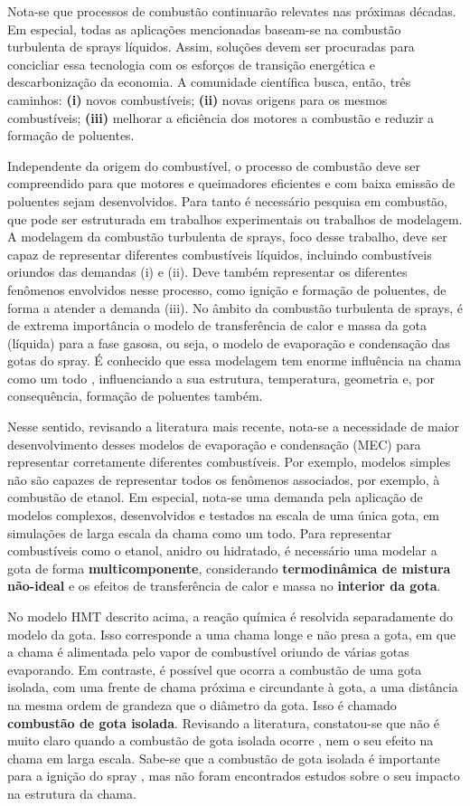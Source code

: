 Nota-se que processos de combustão continuarão relevates nas próximas décadas.
Em especial, todas as aplicações mencionadas baseam-se na combustão turbulenta de sprays líquidos.
Assim, soluções devem ser procuradas para concicliar essa tecnologia com os esforços de transição energética e descarbonização da economia.
A comunidade científica busca, então, três caminhos: \textbf{(i)} novos combustíveis; \textbf{(ii)} novas origens para os mesmos combustíveis; \textbf{(iii)} melhorar a eficiência dos motores a combustão e reduzir a formação de poluentes.

Independente da origem do combustível, o processo de combustão deve ser compreendido para que motores e queimadores eficientes e com baixa emissão de poluentes sejam desenvolvidos.
Para tanto é necessário pesquisa em combustão, que pode ser estruturada em trabalhos experimentais ou trabalhos de modelagem.
A modelagem da combustão turbulenta de sprays, foco desse trabalho, deve ser capaz de representar diferentes combustíveis líquidos, incluindo combustíveis oriundos das demandas (i) e (ii).
Deve também representar os diferentes fenômenos envolvidos nesse processo, como ignição e formação de poluentes, de forma a atender a demanda (iii).
No âmbito da combustão turbulenta de sprays, é de extrema importância o modelo de transferência de calor e massa da gota (líquida) para a fase gasosa, ou seja, o modelo de evaporação e condensação das gotas do spray.
É conhecido que essa modelagem tem enorme influência na chama como um todo , influenciando a sua estrutura, temperatura, geometria e, por consequência, formação de poluentes também.

Nesse sentido, revisando a literatura mais recente, nota-se a necessidade de maior desenvolvimento desses modelos de evaporação e condensação (MEC) para representar corretamente diferentes combustíveis.
Por exemplo, modelos simples não são capazes de representar todos os fenômenos associados, por exemplo, à combustão de etanol.
Em especial, nota-se uma demanda pela aplicação de modelos complexos, desenvolvidos e testados na escala de uma única gota, em simulações de larga escala da chama como um todo.
Para representar combustíveis como o etanol, anidro ou hidratado, é necessário uma modelar a gota de forma \textbf{multicomponente}, considerando \textbf{termodinâmica de mistura não-ideal} e os efeitos de transferência de calor e massa no \textbf{interior da gota}.

No modelo HMT descrito acima, a reação química é resolvida separadamente do modelo da gota.
Isso corresponde a uma chama longe e não presa a gota, em que a chama é alimentada pelo vapor de combustível oriundo de várias gotas evaporando. 
Em contraste, é possível que ocorra a combustão de uma gota isolada, com uma frente de chama próxima e circundante à gota, a uma distância na mesma ordem de grandeza que o diâmetro da gota.
Isso é chamado \textbf{combustão de gota isolada}.
Revisando a literatura, constatou-se que não é muito claro quando a combustão de gota isolada ocorre \source{}, nem o seu efeito na chama em larga escala.
Sabe-se que a combustão de gota isolada é importante para a ignição do spray , mas não foram encontrados estudos sobre o seu impacto na estrutura da chama.

